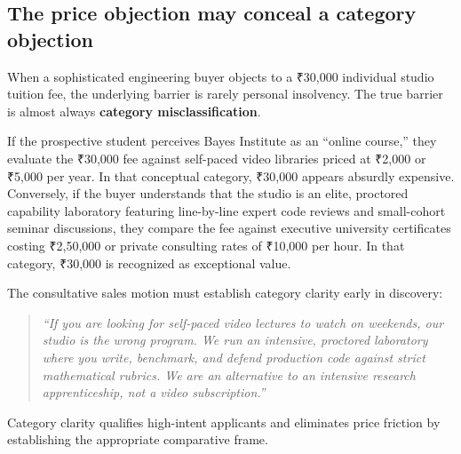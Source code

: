 \subsection{The price objection may conceal a category objection}

When a sophisticated engineering buyer objects to a ₹30,000 individual studio tuition fee, the underlying barrier is rarely personal insolvency. The true barrier is almost always \textbf{category misclassification}.

If the prospective student perceives Bayes Institute as an ``online course,'' they evaluate the ₹30,000 fee against self-paced video libraries priced at ₹2,000 or ₹5,000 per year. In that conceptual category, ₹30,000 appears absurdly expensive. Conversely, if the buyer understands that the studio is an elite, proctored capability laboratory featuring line-by-line expert code reviews and small-cohort seminar discussions, they compare the fee against executive university certificates costing ₹2,50,000 or private consulting rates of ₹10,000 per hour. In that category, ₹30,000 is recognized as exceptional value.

The consultative sales motion must establish category clarity early in discovery:
\begin{quote}
\textit{``If you are looking for self-paced video lectures to watch on weekends, our studio is the wrong program. We run an intensive, proctored laboratory where you write, benchmark, and defend production code against strict mathematical rubrics. We are an alternative to an intensive research apprenticeship, not a video subscription.''}
\end{quote}
Category clarity qualifies high-intent applicants and eliminates price friction by establishing the appropriate comparative frame.
